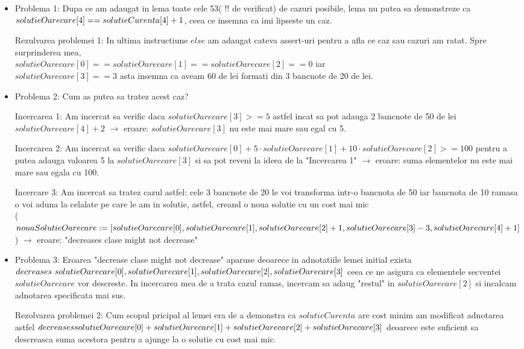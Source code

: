 \begin{itemize}
	\item Problema 1: Dupa ce am adaugat in lema toate cele 53( !! de verificat) de cazuri posibile, lema nu putea sa demonstreze ca $solutieOarecare[4] == solutieCurenta[4] \\ + 1$, ceea ce insemna ca imi lipseste un caz.\par
	Rezulvarea problemei 1: In ultima instructiune $else$ am adaugat cateva assert-uri pentru a afla ce caz sau cazuri am ratat. Spre surprinderea mea,\\ $solutieOarecare[0]==solutieOarecare[1]==solutieOarecare[2]==0$ iar \\ $solutieOarecare[3]==3$  asta insemna ca aveam 60 de lei formati din 3 bancnote de 20 de lei.
	\item Problema 2: Cum as putea sa tratez acest caz?\par 
	Incercarea 1: Am incercat sa verific daca $solutieOarecare[3]>=5$ astfel incat sa pot adauga 2 bancnote de 50 de lei $solutieOarecare[4]+2$ $\rightarrow$ eroare: $solutieOarecare[3]$ nu este mai mare sau egal cu 5.\par
	Incercarea 2: Am incercat sa verific daca $ solutieOarecare[0]+ 5 \cdot solutieOarecare[1]+10\cdot solutieOarecare[2] >=100$ pentru a putea adauga valoarea 5 la $solutieOarecare[3]$ si sa pot reveni la ideea de la "Incercarea 1" $\rightarrow$ eroare: suma elementelor nu este mai mare sau egala cu 100. \par
	Incercare 3: Am incercat sa tratez cazul astfel: cele 3 bancnote de 20 le voi transforma intr-o bancnota de 50 iar bancnota de 10 ramasa o voi aduna la celalate pe care le am in solutie, astfel, creand o noua solutie cu un cost mai mic \\
	($nouaSolutieOarecare := [solutieOarecare[0], solutieOarecare[1], solutieOarecare[2] \\ + 1, solutieOarecare[3] - 3, solutieOarecare[4] + 1]$) $\rightarrow$ eroare: "decreases clase might not decrease"
	\item Problema 3: Eroarea "decrease clase might not decrease" aparuse deoarece in adnotatiile lemei initial exista $decreases \ solutieOarecare[0], solutieOarecare[1],\\ solutieOarecare[2],solutieOarecare[3]$ ceea ce ne asigura ca elementele secventei $solutieOarecare$ vor descreste. In incercarea mea de a trata cazul ramas, incercam sa adaug "restul" in $solutieOarecare[2]$ si incalcam adnotarea specificata mai sus.
	\par 
	Rezolvarea problemei 2: Cum scopul pricipal al lemei era de a demonstra ca $solutieCurenta$ are cost minim am modificat adnotarea astfel $decreases  \\ solutieOarecare[0] + solutieOarecare[1] + solutieOarecare[2] + solutieOarecare[3]$ deoarece este suficient sa descreasca suma acestora pentru a ajunge la o solutie cu cost mai mic.
	
	
	
	
	
	
	
	
	
	
	
	
\end{itemize}













